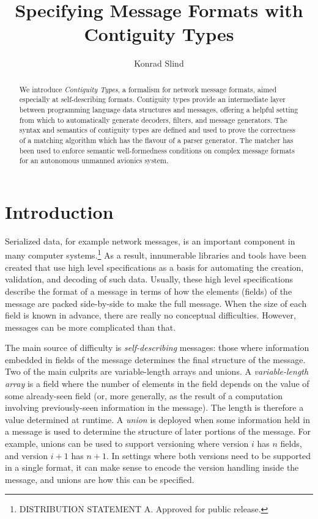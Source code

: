 \documentclass[a4paper,UKenglish,cleveref, autoref, thm-restate]{lipics-v2021}
\title{Specifying Message Formats with Contiguity Types} %
\author{Konrad Slind}{Trusted Systems Group, Collins Aerospace, USA}{konrad.slind@collins.com}{}{}
\begin{document}
\maketitle


\begin{abstract}
We introduce \emph{Contiguity Types}, a formalism for network message
formats, aimed especially at self-describing formats. Contiguity types
provide an intermediate layer between programming language data
structures and messages, offering a helpful setting from which to
automatically generate decoders, filters, and message generators.  The
syntax and semantics of contiguity types are defined and used to prove
the correctness of a matching algorithm which has the flavour of a
parser generator. The matcher has been used to enforce semantic
well-formedness conditions on complex message formats for an
autonomous unmanned avionics system.
\end{abstract}


\section{Introduction}\label{sec:intro}

Serialized data, for example network messages, is an important
component in many computer systems.\footnote{DISTRIBUTION STATEMENT
  A. Approved for public release.}  As a result, innumerable libraries
and tools have been created that use high level specifications as a
basis for automating the creation, validation, and decoding of such
data. Usually, these high level specifications describe the format of
a message in terms of how the elements (fields) of the message are
packed side-by-side to make the full message. When the size of each
field is known in advance, there are really no conceptual
difficulties. However, messages can be more complicated than that.

The main source of difficulty is \emph{self-describing} messages:
those where information embedded in fields of the message determines
the final structure of the message. Two of the main culprits are
variable-length arrays and unions. A \emph{variable-length array} is a
field where the number of elements in the field depends on the value
of some already-seen field (or, more generally, as the result of a
computation involving previously-seen information in the message).
The length is therefore a value determined at runtime. A \emph{union}
is deployed when some information held in a message is used to
determine the structure of later portions of the message. For example,
unions can be used to support versioning where version $i$ has $n$
fields, and version $i+1$ has $n+1$. In settings where both versions
need to be supported in a single format, it can make sense to encode
the version handling inside the message, and unions are how this can
be specified.
\end{document}
